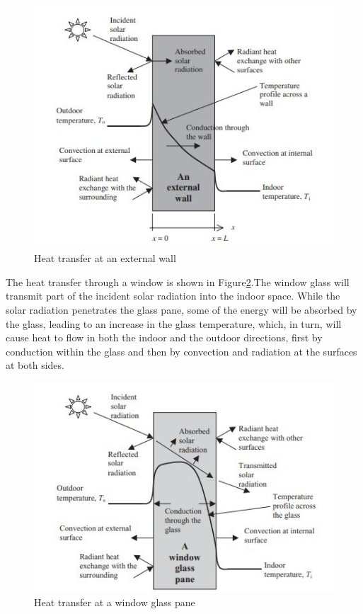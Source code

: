 \documentclass[a4paper,12pt]{article}
\numberwithin{equation}{section}
\begin{document}
\begin{figure}[H]
    \includegraphics[scale=0.8]{heat_transfer2.JPG}
    \centering
    \caption{Heat transfer at an external wall}
    \label{fig:heattransfer2}
\end{figure}

The heat transfer through a window is shown in Figure\ref{fig:heattransfer3}.The window glass will transmit part of the incident solar radiation into the indoor space. While the solar radiation penetrates the glass pane, some of the energy will be absorbed by the glass, leading to an increase in the glass temperature, which, in turn, will cause heat to flow in both the indoor and the outdoor directions, first by conduction within the glass and then by convection and radiation at the surfaces at both sides.

\begin{figure}[H]
    \includegraphics[scale=0.8]{heat_transfer3.JPG}
    \centering
    \caption{Heat transfer at a window glass pane}
    \label{fig:heattransfer3}
\end{figure}
\end{document}
